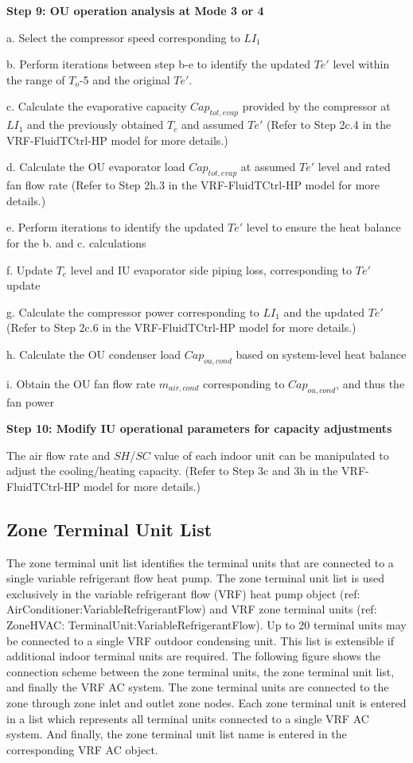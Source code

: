 \textbf{Step 9: OU operation analysis at Mode 3 or 4}

a. Select the compressor speed corresponding to $LI_1$

b. Perform iterations between step b-e to identify the updated $Te'$ level within the range of $T_o$-5 and the original $Te'$.

c. Calculate the evaporative capacity $Cap_{tot,evap}$ provided by the compressor at $LI_1$ and the previously obtained $T_c$ and assumed $Te'$
(Refer to Step 2c.4 in the VRF-FluidTCtrl-HP model for more details.)

d. Calculate the OU evaporator load $Cap_{tot,evap}$ at assumed $Te'$ level and rated fan flow rate
(Refer to Step 2h.3 in the VRF-FluidTCtrl-HP model for more details.)

e. Perform iterations to identify the updated $Te'$ level to ensure the heat balance for the b. and c. calculations

f. Update $T_e$ level and IU evaporator side piping loss, corresponding to $Te'$ update

g. Calculate the compressor power corresponding to $LI_1$ and the updated $Te'$
(Refer to Step 2c.6 in the VRF-FluidTCtrl-HP model for more details.)

h. Calculate the OU condenser load $Cap_{ou,cond}$ based on system-level heat balance

i. Obtain the OU fan flow rate $m_{air,cond}$ corresponding to $Cap_{ou,cond}$, and thus the fan power

\textbf{Step 10: Modify IU operational parameters for capacity adjustments}

The air flow rate and $SH$/$SC$ value of each indoor unit can be manipulated to adjust the cooling/heating capacity.
(Refer to Step 3c and 3h in the VRF-FluidTCtrl-HP model for more details.)


\subsection{Zone Terminal Unit List}\label{zone-terminal-unit-list}

The zone terminal unit list identifies the terminal units that are connected to a single variable refrigerant flow heat pump. The zone terminal unit list is used exclusively in the variable refrigerant flow (VRF) heat pump object (ref: AirConditioner:VariableRefrigerantFlow) and VRF zone terminal units (ref: ZoneHVAC: TerminalUnit:VariableRefrigerantFlow). Up to 20 terminal units may be connected to a single VRF outdoor condensing unit. This list is extensible if additional indoor terminal units are required. The following figure shows the connection scheme between the zone terminal units, the zone terminal unit list, and finally the VRF AC system. The zone terminal units are connected to the zone through zone inlet and outlet zone nodes. Each zone terminal unit is entered in a list which represents all terminal units connected to a single VRF AC system. And finally, the zone terminal unit list name is entered in the corresponding VRF AC object.

